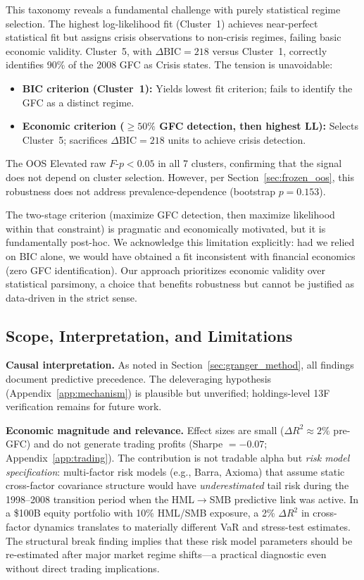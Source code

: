 \documentclass[sigconf,anonymous]{acmart}
\begin{document}
This taxonomy reveals a fundamental challenge with purely statistical regime selection.
The highest log-likelihood fit (Cluster~1) achieves near-perfect statistical fit but
assigns crisis observations to non-crisis regimes, failing basic economic validity.
Cluster~5, with $\Delta\text{BIC} = 218$ versus Cluster~1, correctly identifies 90\% of
the 2008 GFC as Crisis states. The tension is unavoidable:
\begin{itemize}
\item \textbf{BIC criterion (Cluster~1):} Yields lowest fit criterion; fails to identify
the GFC as a distinct regime.
\item \textbf{Economic criterion ($\geq 50\%$ GFC detection, then highest LL):} Selects
Cluster~5; sacrifices $\Delta\text{BIC} = 218$ units to achieve crisis detection.
\end{itemize}

The OOS Elevated raw $F$-$p < 0.05$ in all 7 clusters, confirming that the
signal does not depend on cluster selection. However, per Section~\ref{sec:frozen_oos},
this robustness does not address prevalence-dependence (bootstrap $p = 0.153$).

The two-stage criterion (maximize GFC detection, then maximize likelihood within that constraint)
is pragmatic and economically motivated, but it is fundamentally post-hoc. We acknowledge this
limitation explicitly: had we relied on BIC alone, we would have obtained a fit inconsistent
with financial economics (zero GFC identification). Our approach prioritizes economic validity
over statistical parsimony, a choice that benefits robustness but cannot be justified as data-driven
in the strict sense.


\subsection{Scope, Interpretation, and Limitations}
\label{sec:limitations}

\textbf{Causal interpretation.}
As noted in Section~\ref{sec:granger_method}, all findings document predictive
precedence. The deleveraging hypothesis (Appendix~\ref{app:mechanism}) is plausible but
unverified; holdings-level 13F verification remains for future work.

\textbf{Economic magnitude and relevance.}
Effect sizes are small ($\Delta R^2 \approx 2\%$ pre-GFC) and do not generate
trading profits (Sharpe $= -0.07$; Appendix~\ref{app:trading}).
The contribution is not tradable alpha but \emph{risk model specification}:
multi-factor risk models (e.g., Barra, Axioma) that assume static cross-factor
covariance structure would have \emph{underestimated} tail risk during the
1998--2008 transition period when the HML$\to$SMB predictive link was active.
In a \$100B equity portfolio with 10\% HML/SMB exposure, a 2\% $\Delta R^2$
in cross-factor dynamics translates to materially different VaR and stress-test
estimates. The structural break finding implies that these risk model parameters
should be re-estimated after major market regime shifts---a practical diagnostic
even without direct trading implications.
\end{document}
